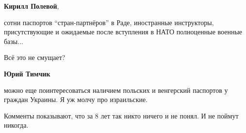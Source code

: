 \begin{itemize}
\begin{itemize}
\textbf{Кирилл Полевой}, 

сотни паспортов \enquote{стран-партнёров} в Раде, иностранные инструкторы,
присутствующие и ожидаемые после вступления в НАТО полноценные военные базы...

Всё это не смущает?

\textbf{Юрий Тимчик} 

можно еще поинтересоваться наличием польских и венгерский паспортов у граждан
Украины. Я уж молчу про израильские.

\end{itemize} %


Комменты показывают, что за 8 лет так никто ничего и не понял. И не поймут
никогда.


\end{itemize} %

